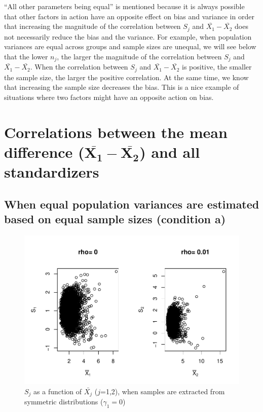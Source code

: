 \documentclass[
  english,
  man,mask,floatsintext]{apa6}
\begin{document}
``All other parameters being equal'' is mentioned because it is always possible that other factors in action have an opposite effect on bias and variance in order that increasing the magnitude of the correlation between \(S_j\) and \(\bar{X_1}-\bar{X_2}\) does not necessarily reduce the bias and the variance. For example, when population variances are equal across groups and sample sizes are unequal, we will see below that the lower \(n_j\), the larger the magnitude of the correlation between \(S_j\) and \(\bar{X_1}-\bar{X_2}\). When the correlation between \(S_j\) and \(\bar{X_1}-\bar{X_2}\) is positive, the smaller the sample size, the larger the positive correlation. At the same time, we know that increasing the sample size decreases the bias. This is a nice example of situations where two factors might have an opposite action on bias.

\hypertarget{correlations-between-the-mean-difference-bmbarx_1-barx_2-and-all-standardizers}{%
\section{\texorpdfstring{Correlations between the mean difference (\(\bm{\bar{X_1}-\bar{X_2}}\)) and all standardizers}{Correlations between the mean difference (\textbackslash bm\{\textbackslash bar\{X\_1\}-\textbackslash bar\{X\_2\}\}) and all standardizers}}\label{correlations-between-the-mean-difference-bmbarx_1-barx_2-and-all-standardizers}}

\hypertarget{when-equal-population-variances-are-estimated-based-on-equal-sample-sizes-condition-a}{%
\subsection{When equal population variances are estimated based on equal sample sizes (condition a)}\label{when-equal-population-variances-are-estimated-based-on-equal-sample-sizes-condition-a}}

\begin{figure}
\centering
\includegraphics{Correlation_files/figure-latex/pltSDMEANHombalsym-1.pdf}
\caption{\label{fig:pltSDMEANHombalsym}\(S_j\) as a function of \(\bar{X_j}\) (\(j\)=1,2), when samples are extracted from symmetric distributions (\(\gamma_1 = 0\))}
\end{figure}
\end{document}
